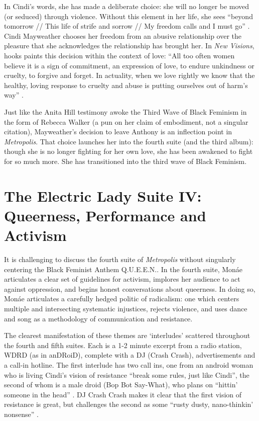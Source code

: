\documentclass[a4paper, 11pt]{article} %
\begin{document}
In Cindi's words, she has made a deliberate choice: she will no longer be moved (or seduced) through violence. 
Without this element in her life, she sees ``beyond tomorrow // This life of strife and sorrow // My freedom calls and I must go'' \cite{babopbyeya}.
Cindi Mayweather chooses her freedom from an abusive relationship over the pleasure that she acknowledges the relationship has brought her.
In \emph{New Visions}, hooks paints this decision within the context of love: ``All too often women believe it is a sign of commitment, an expression of love, to endure unkindness or cruelty, to forgive and forget. In actuality, when we love rightly we know that the healthy, loving response to cruelty and abuse is putting ourselves out of harm's way'' \cite{newvisions}.

Just like the Anita Hill testimony awoke the Third Wave of Black Feminism in the form of Rebecca Walker \cite{rebeccawalker} (a pun on her claim of embodiment, not a singular citation), Mayweather's decision to leave Anthony is an inflection point in \emph{Metropolis}.
That choice launches her into the fourth suite (and the third album): though she is no longer fighting for her own love, she has been awakened to fight for so much more. 
She has transitioned into the third wave of Black Feminism.



\section*{The Electric Lady Suite IV: Queerness, Performance and Activism}

It is challenging to discuss the fourth suite of \emph{Metropolis} without singularly centering the Black Feminist Anthem Q.U.E.E.N..
In the fourth suite, Mon\'ae articulates a clear set of guidelines for activism, implores her audience to act against oppression, and begins honest conversations about queerness.
In doing so, Mon\'ae articulates a carefully hedged politic of radicalism: one which centers multiple and intersecting systematic injustices, rejects violence, and uses dance and song as a methodology of communication and resistance.

The clearest manifestation of these themes are `interludes' scattered throughout the fourth and fifth suites.
Each is a 1-2 minute excerpt from a radio station, WDRD (as in anDRoiD), complete with a DJ (Crash Crash), advertisements and a call-in hotline.
The first interlude has two call ins, one from an android woman who is living Cindi's vision of resistance ``break some rules, just like Cindi'', the second of whom is a male droid (Bop Bot Say-What), who plans on ``hittin' someone in the head'' \cite{goodmorningmidnight}.
DJ Crash Crash makes it clear that the first vision of resistance is great, but challenges the second as some ``rusty dusty, nano-thinkin' nonsense'' \cite{goodmorningmidnight}.
\end{document}
